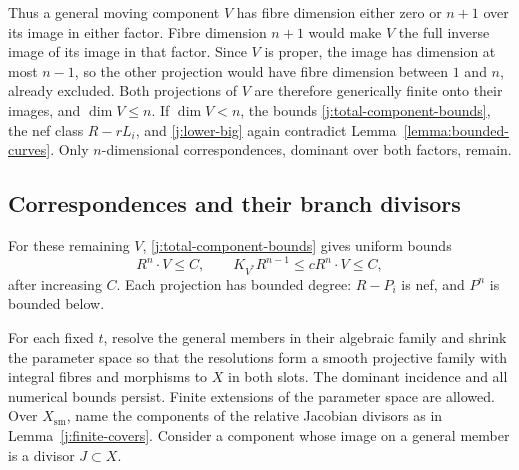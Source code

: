 Thus a general moving component $V$ has fibre dimension either
zero or $n+1$ over its image in either factor. Fibre dimension
$n+1$ would make $V$ the full inverse image of its image in that
factor. Since $V$ is proper, the image has dimension at most
$n-1$, so the other projection would have fibre dimension between
$1$ and $n$, already excluded. Both projections of $V$ are
therefore generically finite onto their images, and $\dim V\le n$.
If $\dim V<n$, the bounds \eqref{j:total-component-bounds}, the
nef class $R-rL_i$, and \eqref{j:lower-big} again contradict
Lemma~\ref{lemma:bounded-curves}. Only $n$-dimensional
correspondences, dominant over both factors, remain.

\subsection{Correspondences and their branch divisors}

For these remaining $V$, \eqref{j:total-component-bounds} gives
uniform bounds
\begin{equation}\label{j:correspondence-bounds}
 R^n\cdot V\le C,
 \qquad K_{V^*}R^{n-1}\le cR^n\cdot V\le C,
\end{equation}
after increasing $C$. Each projection has bounded degree:
$R-P_i$ is nef, and $P^n$ is bounded below.

For each fixed $t$, resolve the general members in their algebraic
family and shrink the parameter space so that the resolutions form
a smooth projective family with integral fibres and morphisms to
$X$ in both slots. The dominant incidence and all numerical bounds
persist. Finite extensions of the parameter space are allowed.
Over $X_{\mathrm{sm}}$, name the components of the relative
Jacobian divisors as in Lemma~\ref{j:finite-covers}. Consider a
component whose image on a general member is a divisor $J\subset X$.

